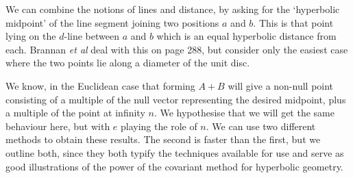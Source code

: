 We can combine the notions of lines and distance, by asking for
the `hyperbolic midpoint' of the line segment joining two
positions $a$ and $b$. This is that point lying on the $d$-line
between $a$ and $b$ which is an equal hyperbolic distance from
each. Brannan \emph{et al}\cite{brannan} deal with this on page 288, but
consider only the easiest case where the two points lie along a diameter of
the unit disc.

We know, in the Euclidean case that forming $A+B$ will give a
non-null point consisting of a multiple of the null vector
representing the desired midpoint, plus a multiple of the point at
infinity $n$. We hypothesise that we will get the same behaviour
here, but with $e$ playing the role of $n$. We can use two
different methods to obtain these results. The second is faster
than the first, but we outline both, since they both typify the
techniques available for use and serve as good illustrations of
the power of the covariant method for hyperbolic geometry.

